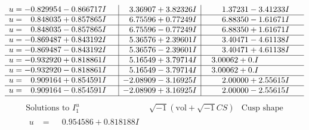 \documentclass[1p]{elsarticle_modified}
\theoremstyle{definition}
\newcommand{\I}{\sqrt{-1}}
\begin{document}
$$\begin{array}{c|c|c}
\begin{aligned}
u &= -0.829954 - 0.866717 I\end{aligned}
 & \phantom{-}3.36907 + 3.82326 I & \phantom{-}1.37231 - 3.41233 I \\ \hline\begin{aligned}
u &= \phantom{-}0.848035 + 0.857865 I\end{aligned}
 & \phantom{-}6.75596 + 0.77249 I & \phantom{-}6.88350 - 1.61671 I \\ \hline\begin{aligned}
u &= \phantom{-}0.848035 - 0.857865 I\end{aligned}
 & \phantom{-}6.75596 - 0.77249 I & \phantom{-}6.88350 + 1.61671 I \\ \hline\begin{aligned}
u &= -0.869487 + 0.843192 I\end{aligned}
 & \phantom{-}5.36576 + 2.39601 I & \phantom{-}3.40471 - 4.61138 I \\ \hline\begin{aligned}
u &= -0.869487 - 0.843192 I\end{aligned}
 & \phantom{-}5.36576 - 2.39601 I & \phantom{-}3.40471 + 4.61138 I \\ \hline\begin{aligned}
u &= -0.932920 + 0.818861 I\end{aligned}
 & \phantom{-}5.16549 + 3.79714 I & \phantom{-}3.00062 + 0. I\phantom{ +0.000000I} \\ \hline\begin{aligned}
u &= -0.932920 - 0.818861 I\end{aligned}
 & \phantom{-}5.16549 - 3.79714 I & \phantom{-}3.00062 + 0. I\phantom{ +0.000000I} \\ \hline\begin{aligned}
u &= \phantom{-}0.909164 + 0.854591 I\end{aligned}
 & -2.08909 - 3.16925 I & \phantom{-}2.00000 + 2.55615 I \\ \hline\begin{aligned}
u &= \phantom{-}0.909164 - 0.854591 I\end{aligned}
 & -2.08909 + 3.16925 I & \phantom{-}2.00000 - 2.55615 I\\
 \hline 
 \end{array}$$\newpage$$\begin{array}{c|c|c}  
\text{Solutions to }I^u_{1}& \I (\text{vol} + \sqrt{-1}CS) & \text{Cusp shape}\\
 \hline 
\begin{aligned}
u &= \phantom{-}0.954586 + 0.818188 I\end{aligned}

\end{array}$$
\end{document}
